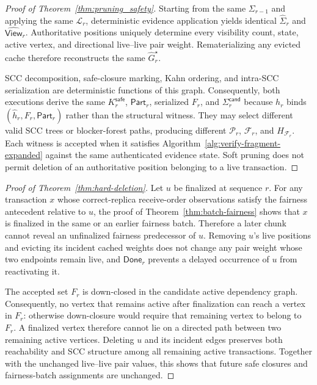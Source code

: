 \begin{proof}[Proof of Theorem~\ref{thm:pruning_safety}]
Starting from the same $\Sigma_{r-1}$ and applying the same $\mathcal L_r$, deterministic evidence application yields identical $\widehat\Sigma_r$ and $\widehat{\mathsf{View}}_r$.  Authoritative positions uniquely determine every visibility count, state, active vertex, and directional live--live pair
weight.  Rematerializing any evicted cache therefore reconstructs the same
$\widehat G_r^\star$.

SCC decomposition, safe-closure marking, Kahn ordering, and intra-SCC serialization are deterministic functions of this graph.  Consequently, both
executions derive the same $K_r^{\mathsf{safe}}$, $\mathsf{Part}_r$, serialized
$F_r$, and $\Sigma_r^{\mathsf{cand}}$ because $h_r$ binds
$(\widehat h_r,F_r,\mathsf{Part}_r)$ rather than the structural witness.  They
may select different valid SCC trees or blocker-forest paths, producing different $\mathcal P_r$,
$\mathcal F_r$, and $H_{\mathcal F_r}$.  Each witness is accepted when it
satisfies Algorithm~\ref{alg:verify-fragment-expanded} against the same
authenticated evidence state.  Soft pruning does not permit deletion of an
authoritative position belonging to a live transaction.
\end{proof}

\begin{proof}[Proof of Theorem~\ref{thm:hard-deletion}]
Let $u$ be finalized at sequence $r$.  For any transaction $x$ whose
correct-replica receive-order observations satisfy the fairness antecedent
relative to $u$, the proof of
Theorem~\ref{thm:batch-fairness} shows that $x$ is finalized in the same or
an earlier fairness batch.  Therefore a later chunk cannot reveal an
unfinalized fairness predecessor of $u$.  Removing $u$'s live positions and
evicting its incident cached weights does not change any pair weight whose two
endpoints remain live, and $\mathsf{Done}_r$ prevents a delayed occurrence of $u$ from
reactivating it.

The accepted set $F_r$ is down-closed in the candidate active dependency graph.
Consequently, no vertex that remains active after finalization can reach a
vertex in $F_r$: otherwise down-closure would require that remaining vertex
to belong to $F_r$.  A finalized vertex therefore cannot lie on a directed
path between two remaining active vertices.  Deleting $u$ and its incident
edges preserves both reachability and SCC structure among all remaining
active transactions.  Together with the unchanged live--live pair values,
this shows that future safe closures and fairness-batch assignments are
unchanged.
\end{proof}

